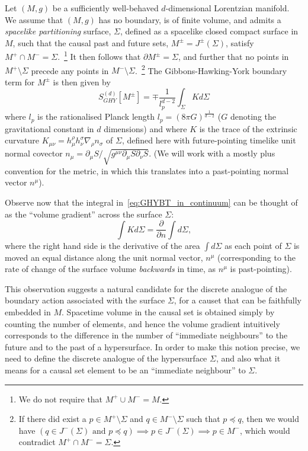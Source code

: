\documentclass[12pt]{article}
\newcommand{\be}{\begin{equation}}
\newcommand{\ee}{\end{equation}}
\begin{document}
Let $(M,g)$ be a sufficiently well-behaved $d$-dimensional Lorentzian manifold. We assume that $(M,g)$ has no boundary, is of finite volume, and admits a \emph{spacelike partitioning} surface, $\Sigma$, defined as a spacelike closed compact surface in $M$, such that the causal past and future sets, $M^\pm=J^\pm (\Sigma)$, satisfy $M^+\cap M^-=\Sigma$.~\!\footnote{We do not require that $M^+\cup M^-=M$.} It then follows that $\partial M^\pm = \Sigma$, and further that no points in $M^+\setminus\Sigma$ precede any points in $M^-\setminus\Sigma$.~\!\footnote{If there did exist a $p\in M^+\setminus\Sigma$ and $q\in M^-\setminus\Sigma$ such that $p\preceq q$, then we would have $(q\in J^-(\Sigma) \text{ and } p\preceq q)\implies p\in J^-(\Sigma)\implies p\in M^-$, which would contradict $M^+\cap M^-=\Sigma$.} The Gibbons-Hawking-York boundary term for $M^\pm$ is then given by
\be\label{eq:GHYBT_in_continuum}
{S}^{(d)}_{GHY}\left[M^\pm\right]= \mp \frac{1}{l_p^{d-2}}\int_{\Sigma} K d\Sigma
\ee
where $l_p$ is the rationalised Planck length $l_p=(8\pi G)^{\frac{1}{d-2}}$ ($G$ denoting the gravitational constant in $d$ dimensions) and where $K$ is the trace of the extrinsic curvature $K_{\mu\nu}=h_{\mu}^\rho h_\nu^\sigma \nabla_\rho n_\sigma$ of $\Sigma$, defined here with future-pointing timelike unit normal covector $n_{\mu}=\partial_\mu S/\sqrt{g^{\mu\nu}\partial_\mu S\partial_\nu S}$. (We will work with a mostly plus convention for the metric, in which this translates into a past-pointing normal vector $n^{\mu}$). 

Observe now that the integral in~\eqref{eq:GHYBT_in_continuum} can be thought of as the ``volume gradient'' across the surface $\Sigma$:
\be\label{eq:normal_deriv_boundary}
\int K d\Sigma = \frac{\partial}{\partial n}\int d\Sigma,
\ee
where the right hand side is the derivative of the area $\int d\Sigma$ as each point of $\Sigma$ is moved an equal distance along the unit normal vector, $n^{\mu}$ (corresponding to the rate of change of the surface volume \emph{backwards} in time, as $n^{\mu}$ is past-pointing).

This observation suggests a natural candidate for the discrete analogue of the boundary action associated with the surface $\Sigma$, for a causet that can be faithfully embedded in $M$. Spacetime volume in the causal set is obtained simply by counting the number of elements, and hence the volume gradient intuitively corresponds to the difference in the number of ``immediate neighbours'' to the future and to the past of a hypersurface. In order to make this notion precise, we need to define the discrete analogue of the hypersurface $\Sigma$, and also what it means for a causal set element to be an ``immediate neighbour'' to $\Sigma$.
\end{document}
